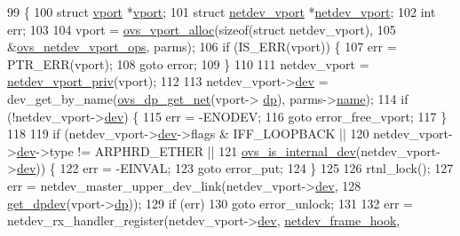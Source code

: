 \begin{DoxyCode}
99 \{
100     \textcolor{keyword}{struct }\hyperlink{structvport}{vport} *\hyperlink{structvport}{vport};
101     \textcolor{keyword}{struct }\hyperlink{structnetdev__vport}{netdev\_vport} *\hyperlink{structnetdev__vport}{netdev\_vport};
102     \textcolor{keywordtype}{int} err;
103 
104     vport = \hyperlink{linux_2vport_8c_a9198ee06111592d2cf6c3b2bf94561c1}{ovs\_vport\_alloc}(\textcolor{keyword}{sizeof}(\textcolor{keyword}{struct} netdev\_vport),
105                 &\hyperlink{linux_2vport-netdev_8c_a881cb730847416574c9c4b3b7c4c3003}{ovs\_netdev\_vport\_ops}, parms);
106     \textcolor{keywordflow}{if} (IS\_ERR(vport)) \{
107         err = PTR\_ERR(vport);
108         \textcolor{keywordflow}{goto} error;
109     \}
110 
111     netdev\_vport = \hyperlink{vport-netdev_8h_a2cb441c6cf067ce3c79cb43836e9fc55}{netdev\_vport\_priv}(vport);
112 
113     netdev\_vport->\hyperlink{structnetdev__vport_acf4ee248f7385e2f987fd2736f824ca9}{dev} = dev\_get\_by\_name(\hyperlink{datapath_8h_aef2302004ca1f45133eaef00bb3740eb}{ovs\_dp\_get\_net}(vport->
      \hyperlink{structvport_a49fb6f6bf0ac4337853e9242e88ddc42}{dp}), parms->\hyperlink{structvport__parms_a4f27e2a7b7dc0493c095cdaabe225b38}{name});
114     \textcolor{keywordflow}{if} (!netdev\_vport->\hyperlink{structnetdev__vport_acf4ee248f7385e2f987fd2736f824ca9}{dev}) \{
115         err = -ENODEV;
116         \textcolor{keywordflow}{goto} error\_free\_vport;
117     \}
118 
119     \textcolor{keywordflow}{if} (netdev\_vport->\hyperlink{structnetdev__vport_acf4ee248f7385e2f987fd2736f824ca9}{dev}->flags & IFF\_LOOPBACK ||
120         netdev\_vport->\hyperlink{structnetdev__vport_acf4ee248f7385e2f987fd2736f824ca9}{dev}->type != ARPHRD\_ETHER ||
121         \hyperlink{linux_2vport-internal__dev_8c_a2056d15823f88a4caeb90001bce724bb}{ovs\_is\_internal\_dev}(netdev\_vport->\hyperlink{structnetdev__vport_acf4ee248f7385e2f987fd2736f824ca9}{dev})) \{
122         err = -EINVAL;
123         \textcolor{keywordflow}{goto} error\_put;
124     \}
125 
126     rtnl\_lock();
127     err = netdev\_master\_upper\_dev\_link(netdev\_vport->\hyperlink{structnetdev__vport_acf4ee248f7385e2f987fd2736f824ca9}{dev},
128                        \hyperlink{linux_2vport-netdev_8c_ae407cdb3541e622199306fa8e2e6cd92}{get\_dpdev}(vport->\hyperlink{structvport_a49fb6f6bf0ac4337853e9242e88ddc42}{dp}));
129     \textcolor{keywordflow}{if} (err)
130         \textcolor{keywordflow}{goto} error\_unlock;
131 
132     err = netdev\_rx\_handler\_register(netdev\_vport->\hyperlink{structnetdev__vport_acf4ee248f7385e2f987fd2736f824ca9}{dev}, \hyperlink{linux_2vport-netdev_8c_a4c69c350d93bf290fea2ff1e9759311d}{netdev\_frame\_hook},

\end{DoxyCode}
